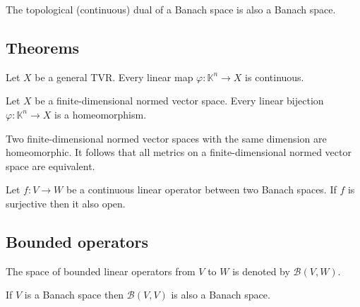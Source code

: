 	\begin{property}
		The topological (continuous) dual of a Banach space is also a Banach space.
	\end{property}

\subsection{Theorems}

	\begin{property}
		Let $X$ be a general TVR. Every linear map $\varphi:\mathbb{K}^n\rightarrow X$ is continuous.
	\end{property}
	\begin{property}
		Let $X$ be a finite-dimensional normed vector space. Every linear bijection $\varphi:\mathbb{K}^n\rightarrow X$ is a homeomorphism.
	\end{property}
	\begin{result}
		Two finite-dimensional normed vector spaces with the same dimension are homeomorphic. It follows that all metrics on a finite-dimensional normed vector space are equivalent.
	\end{result}

	\begin{theorem}
		Let $f:V\rightarrow W$ be a continuous linear operator between two Banach spaces. If $f$ is surjective then it also open.
	\end{theorem}

\subsection{Bounded operators}
	
	\begin{notation}
		The space of bounded linear operators from $V$ to $W$ is denoted by $\mathcal{B}(V, W)$.
	\end{notation}
	\begin{property}
		If $V$ is a Banach space then $\mathcal{B}(V, V)$ is also a Banach space.
	\end{property}

